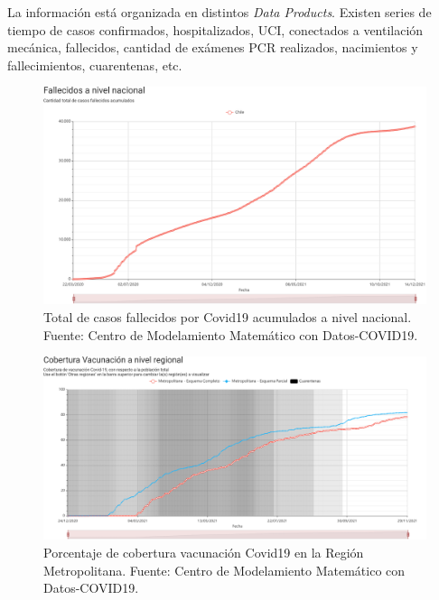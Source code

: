 La información está organizada en distintos \textit{Data Products}. Existen series de tiempo de casos confirmados, hospitalizados, UCI, conectados a ventilación mecánica, fallecidos, cantidad de exámenes PCR realizados, nacimientos y fallecimientos, cuarentenas, etc. 

\begin{figure}[h]
\centering
\includegraphics[width=\textwidth]{img/metodologia/datos/fallecidos_nacional.png}
\caption{Total de casos fallecidos por Covid19 acumulados a nivel nacional. Fuente: Centro de Modelamiento Matemático  con Datos-COVID19.}
\label{img:cmm-fallecidos}
\end{figure}

\begin{figure}[h]
\centering
\includegraphics[width=\textwidth]{img/metodologia/datos/CoberturaVacunacionRM.png}
\caption{Porcentaje de cobertura vacunación Covid19 en la Región Metropolitana. Fuente: Centro de Modelamiento Matemático con Datos-COVID19.}
\label{img:cmm-vacunados}
\end{figure}

